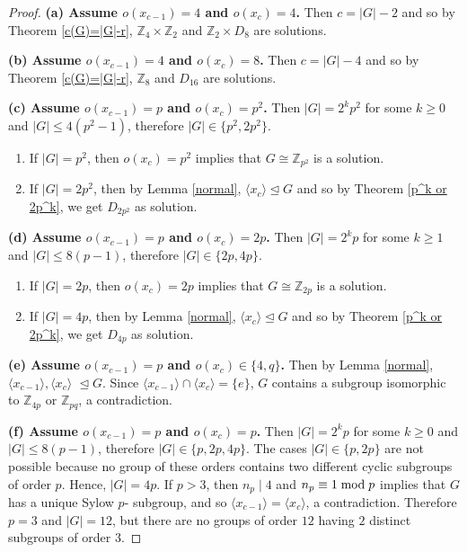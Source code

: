 \documentclass[a4paper,11pt]{amsart}
\numberwithin{equation}{section}
\numberwithin{equation}{subsection}
\begin{document}
\begin{proof}
\textbf{(a) Assume $o(x_{c-1})=4$ and $o(x_{c})=4$.} Then $c=|G|-2$  and so by Theorem \ref{c(G)=|G|-r}, $\mathbb{Z}_{4}\times \mathbb{Z}_2$ and $\mathbb{Z}_2\times D_{8}$ are solutions.

\textbf{(b) Assume $o(x_{c-1})=4$ and $o(x_{c})=8$.} Then $c=|G|-4$ and so by Theorem \ref{c(G)=|G|-r}, $\mathbb{Z}_{8}$ and $ D_{16}$ are solutions.

\textbf{(c) Assume $o(x_{c-1})=p$ and $o(x_{c})=p^2$.} Then $|G|=2^{k}p^2$ for some $k\geq 0$ and $ |G|\leq 4(p^2-1)$, therefore $|G|\in\{p^2,2p^2\}$.
\begin{enumerate}
    \item  If $|G|=p^2$, then $o(x_{c})=p^2$ implies that $G\cong \mathbb{Z}_{p^2}$ is a solution.

    \item If $|G|=2p^2$, then by Lemma \ref{normal}, $\langle x_{c}\rangle \trianglelefteq G$ and so by Theorem \ref{p^k or 2p^k}, we get $D_{2p^2}$ as solution.
\end{enumerate}

\textbf{(d) Assume $o(x_{c-1})=p$ and $o(x_{c})=2p$.} Then $|G|=2^{k}p$ for some $k\geq 1$ and  $|G|\leq 8(p-1)$, therefore $|G|\in\{2p,4p\}$.
\begin{enumerate}
\item If $|G|=2p$, then  $o(x_{c})=2p$ implies that $G\cong \mathbb{Z}_{2p}$ is a solution.

    \item If $|G|=4p$, then by Lemma \ref{normal}, $\langle x_{c}\rangle \trianglelefteq G$ and so by Theorem \ref{p^k or 2p^k}, we get $D_{4p}$ as solution. 
\end{enumerate}

\textbf{(e) Assume $o(x_{c-1})=p$ and $o(x_{c})\in\{4 ,q\}$.} Then by Lemma \ref{normal}, $\langle x_{c-1}\rangle, \langle x_{c}\rangle$ $\trianglelefteq G $. Since $\langle x_{c-1}\rangle\cap \langle x_{c}\rangle = \{e\}$, $G$ contains a subgroup isomorphic to $\mathbb{Z}_{4p}$ or $\mathbb{Z}_{pq}$, a contradiction.




\textbf{(f) Assume $o(x_{c-1})=p$ and $o(x_{c})=p$.} Then $|G|=2^{k}p$ for some $k\geq 0$ and $|G|\leq 8(p-1)$, therefore $|G|\in \{p,2p,4p\}$. The cases $|G|\in\{p,2p\}$ are not possible because no group of these orders contains two different cyclic subgroups of order $p$. Hence, $|G|=4p$. If $p>3$, then $n_p\mid 4$ and $n_p \equiv 1 \hspace{1mm} \text{mod} \hspace{1mm}p$ implies that $G$ has a unique Sylow $p$- subgroup, and so $\langle x_{c-1}\rangle = \langle x_{c}\rangle$, a contradiction. Therefore $p=3$ and $|G|=12$, but there are no groups of order $12$ having $2$ distinct subgroups of order $3.$
\end{proof}
\end{document}
